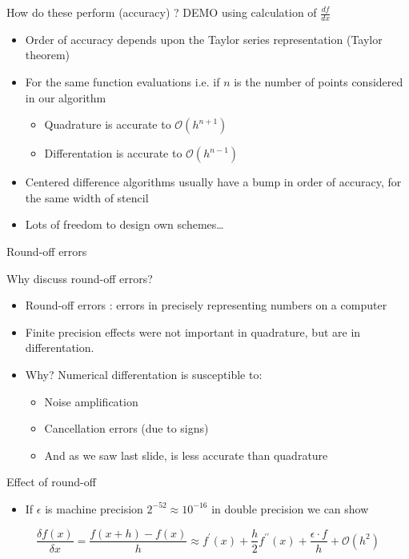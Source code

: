 \documentclass[presentation]{beamer}
\newcommand{\order}[1]{\mathcal O \left( #1 \right)} %
\begin{document}
\begin{frame}[label={sec:orgc6fc09c}]{How do these perform (accuracy) ?}
\alert{DEMO} using calculation of \(\frac{df}{dx}\)
\begin{itemize}
\item Order of accuracy depends upon the Taylor series representation (\alert{Taylor
theorem})
\item For the same function evaluations i.e. if \(n\) is the number of points
considered in our algorithm
\begin{itemize}
\item Quadrature is accurate to \(\order{h^{n+1}}\)
\item Differentation is accurate to \(\order{h^{n-1}}\)
\end{itemize}
\item Centered difference algorithms usually have a bump in order of accuracy,
for the same width of stencil
\item Lots of freedom to design own schemes\ldots{}
\end{itemize}
\end{frame}
\begin{frame}[label={sec:orga95b403}]{Round-off errors}
\begin{block}{Why discuss round-off errors?}
\begin{itemize}
\item Round-off errors : errors in precisely representing numbers on a computer
\item Finite precision effects were not important in quadrature, but are in
differentation.
\item \alert{Why}? Numerical differentation is susceptible to:
\begin{itemize}
\item Noise amplification
\item Cancellation errors (due to signs)
\item And as we saw last slide, is less accurate than quadrature
\end{itemize}
\end{itemize}
\end{block}
\begin{block}{Effect of round-off}
\begin{itemize}
\item If \(\epsilon\) is machine precision \(2^{-52} \approx 10^{-16}\) in
double precision we can show
\end{itemize}
\[\frac{\delta f(x)}{\delta x} = \frac{f(x+h) - f(x)}{h} \approx
	f^{\prime}(x)  + \frac{h}{2}f^{\prime\prime}(x) + \frac{\epsilon \cdot
	f}{h} + \order{h^2} \]
\end{block}
\end{frame}
\end{document}
